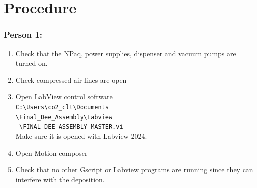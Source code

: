 \documentclass[12pt]{cornelltfpxsop}
\begin{document}
\section{Procedure}
\begin{paracol}{2} %

\subsubsection*{Person 1:}
\begin{enumerate}
    \item Check that the NPaq, power supplies, dispenser and vacuum pumps are\\turned on.
    \item Check compressed air lines are open
    \item Open LabView control software \\ \verb|C:\Users\co2_clt\Documents| \\ \verb|\Final_Dee_Assembly\Labview|\\ \verb| \FINAL_DEE_ASSEMBLY_MASTER.vi|\\ Make sure it is opened with Labview 2024.
    \item Open Motion composer
    \item Check that no other Gscript or Labview programs are running since they can interfere with the deposition.


\end{enumerate}
\end{paracol}
\end{document}
